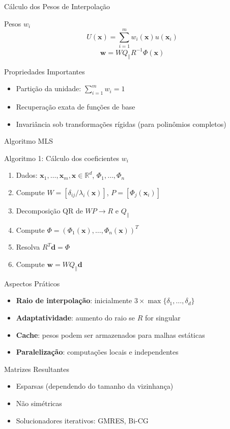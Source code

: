 \documentclass[../main/main.tex]{subfiles}
\begin{document}
\begin{frame}{Cálculo dos Pesos de Interpolação}
\begin{block}{Pesos $w_i$}
\[
U(\mathbf{x}) = \sum_{i=1}^m w_i(\mathbf{x}) u(\mathbf{x}_i)
\]
\[
\mathbf{w} = W Q_\parallel R^{-1} \Phi(\mathbf{x})
\]
\end{block}

\begin{block}{Propriedades Importantes}
\begin{itemize}
\item Partição da unidade: $\sum_{i=1}^m w_i = 1$
\item Recuperação exata de funções de base
\item Invariância sob transformações rígidas (para polinômios completos)
\end{itemize}
\end{block}
\end{frame}

\begin{frame}{Algoritmo MLS}
\begin{block}{Algoritmo 1: Cálculo dos coeficientes $w_i$}
\begin{enumerate}
\item Dados: $\mathbf{x}_1, \ldots, \mathbf{x}_m, \mathbf{x} \in \mathbb{R}^d$, $\Phi_1, \ldots, \Phi_n$
\item Compute $W = [\delta_{ij}/\lambda_i(\mathbf{x})]$, $P = [\Phi_j(\mathbf{x}_i)]$
\item Decomposição QR de $WP \rightarrow R$ e $Q_\parallel$
\item Compute $\Phi = (\Phi_1(\mathbf{x}), \ldots, \Phi_n(\mathbf{x}))^T$
\item Resolva $R^T \mathbf{d} = \Phi$
\item Compute $\mathbf{w} = W Q_\parallel \mathbf{d}$
\end{enumerate}
\end{block}
\end{frame}

\begin{frame}{Aspectos Práticos}
\begin{itemize}
\item \textbf{Raio de interpolação}: inicialmente $3 \times \max\{\delta_1, \ldots, \delta_d\}$
\item \textbf{Adaptatividade}: aumento do raio se $R$ for singular
\item \textbf{Cache}: pesos podem ser armazenados para malhas estáticas
\item \textbf{Paralelização}: computações locais e independentes
\end{itemize}

\begin{block}{Matrizes Resultantes}
\begin{itemize}
\item Esparsas (dependendo do tamanho da vizinhança)
\item Não simétricas
\item Solucionadores iterativos: GMRES, Bi-CG
\end{itemize}
\end{block}
\end{frame}
\end{document}
